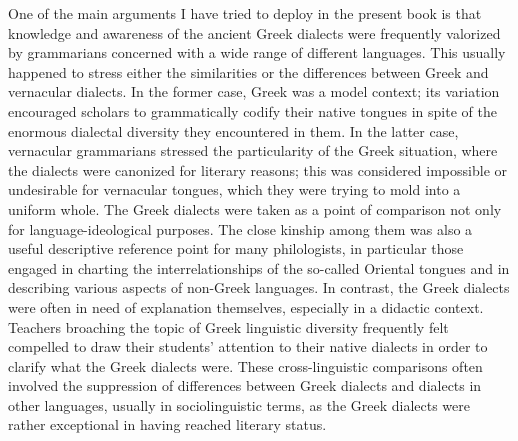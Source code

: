 One of the main arguments I have tried to deploy in the present book is that knowledge and awareness of the ancient Greek dialects were frequently valorized by grammarians concerned with a wide range of different languages. This usually happened to stress either the similarities or the differences between Greek and vernacular dialects. In the former case, Greek was a model context; its variation encouraged scholars to grammatically codify their native tongues in spite of the enormous dialectal diversity they encountered in them. In the latter case, vernacular grammarians stressed the particularity of the Greek situation, where the dialects were canonized for literary reasons; this was considered impossible or undesirable for vernacular tongues, which they were trying to mold into a uniform whole. The Greek dialects were taken as a point of comparison not only for language-ideological purposes. The close kinship among them was also a useful descriptive reference point for many philologists, in particular those engaged in charting the interrelationships of the so-called Oriental tongues and in describing various aspects of non-Greek languages. In contrast, the Greek dialects were often in need of explanation themselves, especially in a didactic context. Teachers broaching the topic of Greek linguistic diversity frequently felt compelled to draw their students’ attention to their native dialects in order to clarify what the Greek dialects were. These cross-linguistic comparisons often involved the suppression of differences between Greek dialects and dialects in other languages, usually in sociolinguistic terms, as the Greek dialects were rather exceptional in having reached literary status.

